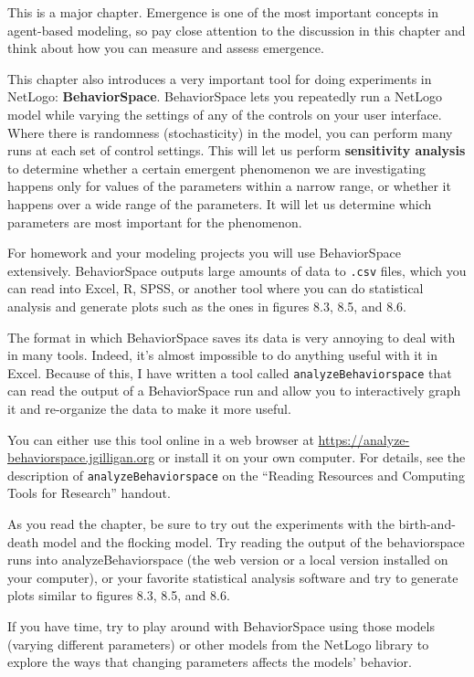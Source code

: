 \documentclass[]{article}
\begin{document}
This is a major chapter. Emergence is one of the most important concepts
in agent-based modeling, so pay close attention to the discussion in
this chapter and think about how you can measure and assess emergence.

This chapter also introduces a very important tool for doing experiments
in NetLogo: \textbf{BehaviorSpace}. BehaviorSpace lets you repeatedly
run a NetLogo model while varying the settings of any of the controls on
your user interface. Where there is randomness (stochasticity) in the
model, you can perform many runs at each set of control settings. This
will let us perform \textbf{sensitivity analysis} to determine whether a
certain emergent phenomenon we are investigating happens only for values
of the parameters within a narrow range, or whether it happens over a
wide range of the parameters. It will let us determine which parameters
are most important for the phenomenon.

For homework and your modeling projects you will use BehaviorSpace
extensively. BehaviorSpace outputs large amounts of data to
\texttt{.csv} files, which you can read into Excel, R, SPSS, or another
tool where you can do statistical analysis and generate plots such as
the ones in figures 8.3, 8.5, and 8.6.

The format in which BehaviorSpace saves its data is very annoying to
deal with in many tools. Indeed, it's almost impossible to do anything
useful with it in Excel. Because of this, I have written a tool called
\texttt{analyzeBehaviorspace} that can read the output of a
BehaviorSpace run and allow you to interactively graph it and
re-organize the data to make it more useful.

You can either use this tool online in a web browser at
\url{https://analyze-behaviorspace.jgilligan.org} or install it on your
own computer. For details, see the description of
\texttt{analyzeBehaviorspace} on the ``Reading Resources and Computing
Tools for Research'' handout.

As you read the chapter, be sure to try out the experiments with the
birth-and-death model and the flocking model. Try reading the output of
the behaviorspace runs into analyzeBehaviorspace (the web version or a
local version installed on your computer), or your favorite statistical
analysis software and try to generate plots similar to figures 8.3, 8.5,
and 8.6.

If you have time, try to play around with BehaviorSpace using those
models (varying different parameters) or other models from the NetLogo
library to explore the ways that changing parameters affects the models'
behavior.
\end{document}

